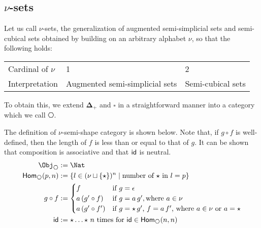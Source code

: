 \documentclass{msc}
\newcommand{\DeltaPlus}{\ensuremath{\boldsymbol{\Delta}_+}}
\newcommand{\Cube}{\ensuremath{\boldsymbol{{\square}}}}
\newcommand{\kstar}{{\star}}
\def\graymidrule{\arrayrulecolor{gray30}\midrule\arrayrulecolor{gray65}}
\begin{document}
\subsection*{\texorpdfstring{$\nu$}{ν}-sets}
Let us call $\nu$-sets, the generalization of augmented semi-simplicial sets and semi-cubical sets obtained by building on an arbitrary alphabet $\nu$, so that the following holds:

\begin{center}
  \begin{tabularx}{0.7\linewidth}{X|X|X}
    \toprule
    Cardinal of $\nu$ & 1                              & 2                 \\
    \graymidrule
    Interpretation    & Augmented semi-simplicial sets & Semi-cubical sets \\
    \bottomrule
  \end{tabularx}
\end{center}

To obtain this, we extend $\DeltaPlus$ and $\Cube$ in a straightforward manner into a category which we call $\hexagon$.

\begin{definition}[$\hexagon$]
  The definition of $\nu$-semi-shape category is shown below. Note that, if $g \circ f$ is well-defined, then the length of $f$ is less than or equal to that of $g$. It can be shown that composition is associative and that $\mathsf{id}$ is neutral.
  \begin{align*}
    \Obj_{\hexagon}       & := \Nat                                                                          \\
    \Hom_{\hexagon}(p, n) & := \{l \in (\nu \sqcup \{\kstar\})^n \mid \text{number of $\kstar$ in $l = p$}\} \\
    g \circ f             & :=
    \begin{cases}
      f                & \text{if $g = \epsilon$}                                                   \\
      a\,(g' \circ f)  & \text{if $g = a\,g'$}, \text{where $a \in \nu$}                            \\
      a\,(g' \circ f') & \text{if $g = \kstar\,g'$, $f = a\,f'$, where $a \in \nu$ or $a = \kstar$} \\
    \end{cases}            \\
    \id                   & := \kstar \ldots \kstar \text{ $n$ times for $\id \in \Hom_{\hexagon}(n, n)$}
  \end{align*}
\end{definition}
\end{document}
